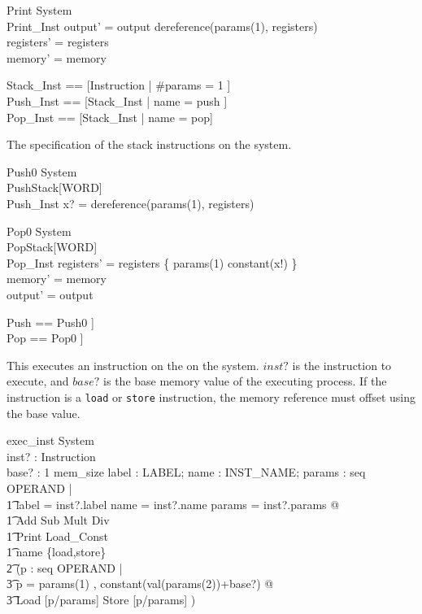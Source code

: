 \begin{schema}{Print}
    \Xi System\\
    Print\_Inst
\where
    output' = output \cat \langle dereference(params(1), registers) \rangle\\
    registers' = registers\\
    memory' = memory
\end{schema}

\begin{zed}
    Stack\_Inst == [Instruction | \#params = 1 ]\\
    Push\_Inst == [Stack\_Inst | name = push ]\\
    Pop\_Inst == [Stack\_Inst | name = pop]
\end{zed}

The specification of the stack instructions on the system.

\begin{schema}{Push0}
    \Xi System\\
    PushStack[WORD]\\
    Push\_Inst
\where
     x? = dereference(params(1), registers)
\end{schema}

\begin{schema}{Pop0}
    \Delta System\\
    PopStack[WORD]\\
    Pop\_Inst
\where
    registers' = registers \oplus \{ params(1) \mapsto constant(x!) \}\\
    memory' = memory\\
    output' = output
\end{schema}

\begin{zed}
    Push == Push0 \project [ System ; Stack [WORD] ]\\
    Pop == Pop0 \project [System ; Stack [WORD] ]
\end{zed}

This executes an instruction on the on the system. $inst?$ is the
instruction to execute, and $base?$ is the base memory value of the
executing process. If the instruction is a {\tt load} or {\tt store}
instruction, the memory reference must offset using the base value.

\begin{schema}{exec\_inst}
    \Delta System\\
    inst? : Instruction\\
    base? : 1 \upto mem\_size
\where
    \exists label : \power LABEL; name : INST\_NAME; params : seq OPERAND |\\
	\t1 label = inst?.label \land name = inst?.name \land params = inst?.params @\\
	\t1 Add \lor Sub \lor Mult \lor Div \lor\\
	\t1 Print \lor Load\_Const \lor\\
	\t1 name \in \{load,store\} \implies\\
	    \t2 (\exists p : seq OPERAND |\\
		\t3 p = \langle params(1) , constant(val(params(2))+base?) \rangle @\\
               \t3 Load [p/params] \lor Store [p/params] )
\end{schema}


